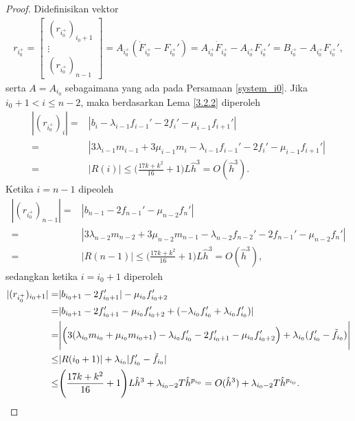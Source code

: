 \begin{proof}
    Didefinisikan vektor
    \begin{align*}
        r_{i_0^{+}}=
        \begin{bmatrix}
        (r_{i_0^{+}})_{i_0 + 1}\\
        \vdots\\
        (r_{i_0^{+}})_{n-1}
        \end{bmatrix}
        = A_{i_0^+}(\dot{F}_{i_0^+} - F_{i_0^+}') = A_{i_0^+}\dot{F}_{i_0^+} - A_{i_0^+}F_{i_0^+}' = B_{i_0^+} - A_{i_0^+}F_{i_0^+}',
    \end{align*}
     serta $A = A_{i_0}$ sebagaimana yang ada pada Persamaan \eqref{system_i0}.
    Jika $i_0 + 1 < i \leq n - 2$, maka berdasarkan Lema \ref{3.2.2} diperoleh
    \begin{align*}
        |(r_{i_0^{+}})_i| =& |b_i - \lambda_{i-1}f_{i-1}' - 2f_i' - \mu_{i-1}f_{i+1}'|\\
        =&|3\lambda_{i-1}m_{i-1} + 3\mu_{i-1}m_{i} - \lambda_{i-1}f_{i-1}' - 2f_i' - \mu_{i-1}f_{i+1}'| \\
        =&|R(i)| \leq \Bigg( \frac{17k + k^2}{16} + 1 \Bigg) L\hat{h}^3 = O(\hat{h}^3).
    \end{align*}
    Ketika $i=n - 1$ dipeoleh
    \begin{align*}
        |(r_{i_0^{+}})_{n - 1}| =& |b_{n-1} - 2f_{n-1}' - \mu_{n-2}f_{n}'|\\
        =&|3\lambda_{n-2}m_{n-2} + 3\mu_{n-2}m_{n-1} - \lambda_{n-2}f_{n-2}' - 2f_{n-1}' - \mu_{n-2}f_{n}'| \\
        =&|R(n-1)| \leq \Bigg( \frac{17k + k^2}{16} + 1 \Bigg) L\hat{h}^3 = O(\hat{h}^3),
    \end{align*}
    sedangkan ketika $i = i_0 + 1$ diperoleh
    \begin{align*}
        |(r_{i_0^{+}})_{i_0 + 1}| =& |b_{i_0+1}  - 2f_{i_0+1}'| - \mu_{i_0}f_{i_0+2}' \\
        =& |b_{i_0+1} - 2f_{i_0+1}' - \mu_{i_0}f_{i_0+2}' + (-\lambda_{i_0}f_{i_0}' + \lambda_{i_0}f_{i_0}')|\\
        =&\Bigg| \Big( 3(\lambda_{i_0}m_{i_0} + \mu_{i_0}m_{i_0 + 1}) - \lambda_{i_0}f_{i_0}' - 2f_{i_0 + 1}' - \mu_{i_0}f_{i_0+2}' \Big) + \lambda_{i_0}(f_{i_0}' - \Tilde{f}_{i_0})\Bigg| \\
        \leq&|R(i_0 + 1)| + \lambda_{i_0}|f_{i_0}' - \Tilde{f}_{i_0}| \\
        \leq&\Bigg( \frac{17k + k^2}{16} + 1 \Bigg)L\hat{h}^3 + \lambda_{i_0 - 2} T \hat{h}^{p_{i_0}} = O(\hat{h}^3) + \lambda_{i_0 - 2} T \hat{h}^{p_{i_0}}.
    \end{align*}
    

\end{proof}
